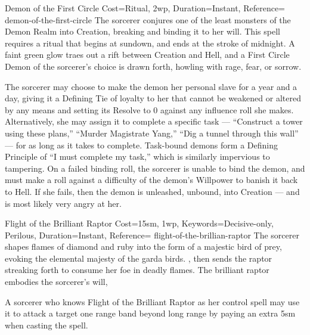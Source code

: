 \begin{Spell}{Demon of the First Circle}{%
    Cost={Ritual, 2wp},
    Duration=Instant,
    Reference=\cite*[p.~473]{ex3}
}{demon-of-the-first-circle}
    The sorcerer conjures one of the least monsters of the Demon Realm into
    Creation, breaking and binding it to her will. This spell requires a ritual
    that begins at sundown, and ends at the stroke of midnight. A faint green
    glow traes out a rift between Creation and Hell, and a First Circle Demon
    of the sorcerer's choice is drawn forth, howling with rage, fear, or
    sorrow.

     The sorcerer may choose to make the demon her personal slave for
    a year and a day, giving it a Defining Tie of loyalty to her that cannot be
    weakened or altered by any means and setting its Resolve to 0 against any
    influence roll she makes. Alternatively, she may assign it to complete a
    specific task --- ``Construct a tower using these plans,'' ``Murder
    Magistrate Yang,'' ``Dig a tunnel through this wall'' --- for as long as it
    takes to complete. Task-bound demons form a Defining Principle of ``I must
    complete my task,'' which is similarly impervious to tampering. On a failed
    binding roll, the sorcerer is unable to bind the demon, and must make a
     roll against a difficulty of the
    demon's Willpower to banish it back to Hell. If she fails, then the demon
    is unleashed, unbound, into Creation --- and is most likely very angry at
    her.
\end{Spell}


\begin{Spell}{Flight of the Brilliant Raptor}{%
    Cost={15sm, 1wp},
    Keywords={Decisive-only, Perilous},
    Duration=Instant,
    Reference=\cite*[p.~473]{ex3}
}{flight-of-the-brillian-raptor}
    The sorcerer shapes flames of diamond and ruby into the form of a majestic
    bird of prey, evoking the elemental majesty of the garda birds. , then sends
    the raptor streaking forth to consume her foe in deadly flames. The
    brilliant raptor embodies the sorcerer's will, 

    \begin{Unavailable}
        A sorcerer who knows Flight of the Brilliant Raptor as her control
        spell may use it to attack a target one range band beyond long range by
        paying an extra 5sm when casting the spell.
    \end{Unavailable}
\end{Spell}


